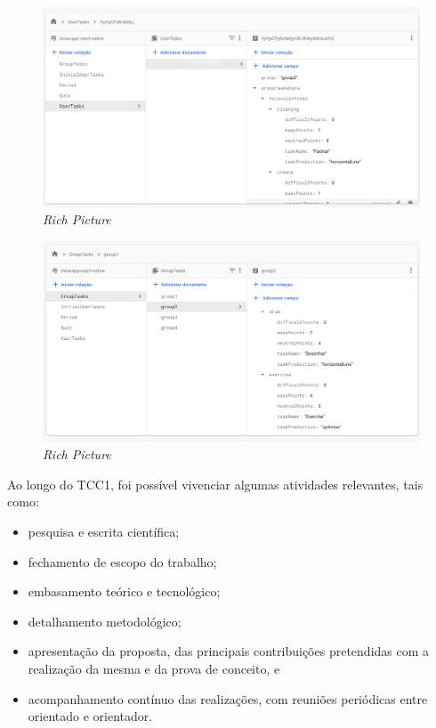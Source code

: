 \begin{figure}[ht]
    \centering
    \includegraphics[keepaspectratio=true,scale=0.37]{figuras/db4.jpeg}
    \caption{\emph{Rich Picture}}
        \label{fig24}
\end{figure}

\begin{figure}[ht]
    \centering
    \includegraphics[keepaspectratio=true,scale=0.37]{figuras/db3.png}
    \caption{\emph{Rich Picture}}
        \label{fig25}
\end{figure}



Ao longo do TCC1, foi possível vivenciar algumas atividades relevantes, tais como:

\begin{itemize}
    \item pesquisa e escrita científica;
    \item fechamento de escopo do trabalho;
    \item embasamento teórico e tecnológico;
    \item detalhamento metodológico;
    \item apresentação da proposta, das principais contribuições pretendidas com a realização da mesma e da prova de conceito, e
    \item acompanhamento contínuo das realizações, com reuniões periódicas entre orientado e orientador.
\end{itemize}

